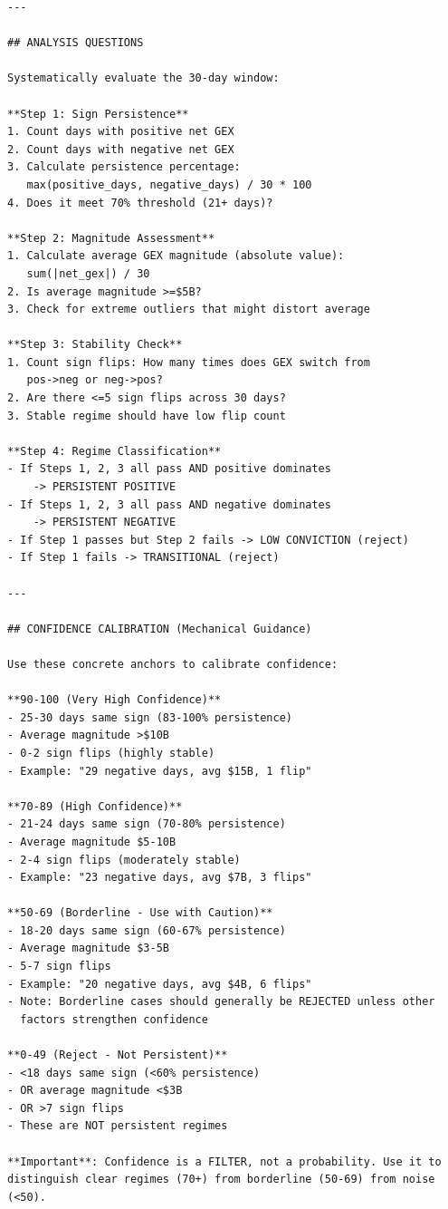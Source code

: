 \documentclass[jrfm,article,accept,moreauthors,pdftex]{Definitions/mdpi}
\begin{document}
\begin{verbatim}
---

## ANALYSIS QUESTIONS

Systematically evaluate the 30-day window:

**Step 1: Sign Persistence**
1. Count days with positive net GEX
2. Count days with negative net GEX
3. Calculate persistence percentage:
   max(positive_days, negative_days) / 30 * 100
4. Does it meet 70% threshold (21+ days)?

**Step 2: Magnitude Assessment**
1. Calculate average GEX magnitude (absolute value):
   sum(|net_gex|) / 30
2. Is average magnitude >=$5B?
3. Check for extreme outliers that might distort average

**Step 3: Stability Check**
1. Count sign flips: How many times does GEX switch from
   pos->neg or neg->pos?
2. Are there <=5 sign flips across 30 days?
3. Stable regime should have low flip count

**Step 4: Regime Classification**
- If Steps 1, 2, 3 all pass AND positive dominates
    -> PERSISTENT POSITIVE
- If Steps 1, 2, 3 all pass AND negative dominates
    -> PERSISTENT NEGATIVE
- If Step 1 passes but Step 2 fails -> LOW CONVICTION (reject)
- If Step 1 fails -> TRANSITIONAL (reject)

---

## CONFIDENCE CALIBRATION (Mechanical Guidance)

Use these concrete anchors to calibrate confidence:

**90-100 (Very High Confidence)**
- 25-30 days same sign (83-100% persistence)
- Average magnitude >$10B
- 0-2 sign flips (highly stable)
- Example: "29 negative days, avg $15B, 1 flip"

**70-89 (High Confidence)**
- 21-24 days same sign (70-80% persistence)
- Average magnitude $5-10B
- 2-4 sign flips (moderately stable)
- Example: "23 negative days, avg $7B, 3 flips"

**50-69 (Borderline - Use with Caution)**
- 18-20 days same sign (60-67% persistence)
- Average magnitude $3-5B
- 5-7 sign flips
- Example: "20 negative days, avg $4B, 6 flips"
- Note: Borderline cases should generally be REJECTED unless other
  factors strengthen confidence

**0-49 (Reject - Not Persistent)**
- <18 days same sign (<60% persistence)
- OR average magnitude <$3B
- OR >7 sign flips
- These are NOT persistent regimes

**Important**: Confidence is a FILTER, not a probability. Use it to
distinguish clear regimes (70+) from borderline (50-69) from noise
(<50).


\end{verbatim}
\end{document}
